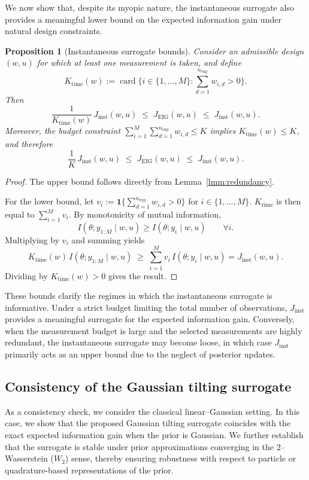 \documentclass[a4paper,11pt]{article}
\newtheorem{proposition}{Proposition}
\begin{document}
We now show that, despite its myopic nature, the instantaneous surrogate
also provides a meaningful lower bound on the expected information gain under
natural design constraints. 
\begin{proposition}[Instantaneous surrogate bounds]
Consider an admissible design $(w,u)$ for which at least one measurement is taken, and define
\[
K_{\mathrm{time}}(w)
:=
\operatorname{card}
\Big\{
i\in\{1,\dots,M\} :
\sum_{d=1}^{n_{\mathrm{exp}}} w_{i,d} > 0
\Big\}.
\]
Then
\[
\frac{1}{K_{\mathrm{time}}(w)}\, J_{\mathrm{inst}}(w,u)
\;\le\;
J_{\mathrm{EIG}}(w,u)
\;\le\;
J_{\mathrm{inst}}(w,u).
\]
Moreover, the budget constraint $\sum\limits_{i=1}^{M} \sum\limits_{d=1}^{n_{\mathrm{exp}}} w_{i,d} \le K$ implies
$K_{\mathrm{time}}(w)\le K$, and therefore
\[
\frac{1}{K}\, J_{\mathrm{inst}}(w,u)
\;\le\;
J_{\mathrm{EIG}}(w,u)
\;\le\;
J_{\mathrm{inst}}(w,u).
\]
\end{proposition}
\begin{proof}
The upper bound follows directly from Lemma~\ref{lmm:redundancy}.

For the lower bound, let
\(
v_i := \mathbf{1}\Big\{\sum_{d=1}^{n_{\mathrm{exp}}} w_{i,d} > 0\Big\}
\) for $i\in \{1,\dots,M\}$. 
$K_{\mathrm{time}}$ is then equal to $\sum\limits_{i=1}^M v_i$.
By monotonicity of mutual information,
\[
I(\theta; y_{1:M}\mid w,u)\ge I(\theta; y_i\mid w,u)
\qquad \forall i.
\]
Multiplying by $v_i$ and summing yields
\[
K_{\mathrm{time}}(w)\, I(\theta; y_{1:M}\mid w,u)
\;\ge\;
\sum_{i=1}^M v_i\, I(\theta; y_i\mid w,u)
= J_{\mathrm{inst}}(w,u).
\]
Dividing by $K_{\mathrm{time}}(w)>0$ gives the result.
\end{proof}
These bounds clarify the regimes in which the instantaneous surrogate is
informative. Under a strict budget limiting the total number of observations,
$J_{\mathrm{inst}}$ provides a meaningful surrogate for the expected information
gain. Conversely, when the measurement budget is large and the selected measurements
are highly redundant, the instantaneous surrogate may become loose, in which
case $J_{\mathrm{inst}}$ primarily acts as an upper bound due to the neglect of
posterior updates.

\subsection{Consistency of the Gaussian tilting surrogate} \label{subsec:tilt-theory}

As a consistency check, we consider the classical linear--Gaussian setting.
In this case, we show that the proposed Gaussian tilting surrogate coincides
with the exact expected information gain when the prior is Gaussian.
We further establish that the surrogate is stable under prior
approximations converging in the $2$--Wasserstein ($W_2$) sense,
thereby ensuring robustness with respect to particle or quadrature-based
representations of the prior.
\end{document}

